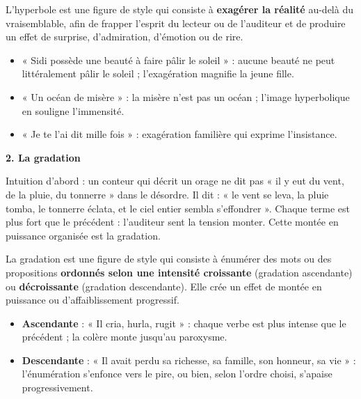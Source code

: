\documentclass[11pt]{article}
\newcommand{\cle}[1]{{\popxbold\color{popdark}#1}}
\begin{document}
\begin{definition}[L'hyperbole]
L'\cle{hyperbole} est une figure de style qui consiste à \textbf{exagérer la réalité} au-delà du vraisemblable, afin de frapper l'esprit du lecteur ou de l'auditeur et de produire un effet de surprise, d'admiration, d'émotion ou de rire.
\end{definition}

\begin{exemplebox}
\begin{itemize}
\item « Sidi possède une beauté à faire pâlir le soleil » : aucune beauté ne peut littéralement pâlir le soleil ; l'exagération magnifie la jeune fille.
\item « Un océan de misère » : la misère n'est pas un océan ; l'image hyperbolique en souligne l'immensité.
\item « Je te l'ai dit mille fois » : exagération familière qui exprime l'insistance.
\end{itemize}
\end{exemplebox}

\textbf{2. La gradation}

Intuition d'abord : un conteur qui décrit un orage ne dit pas « il y eut du vent, de la pluie, du tonnerre » dans le désordre. Il dit : « le vent se leva, la pluie tomba, le tonnerre éclata, et le ciel entier sembla s'effondrer ». Chaque terme est plus fort que le précédent : l'auditeur sent la tension monter. Cette montée en puissance organisée est la gradation.

\begin{definition}[La gradation]
La \cle{gradation} est une figure de style qui consiste à énumérer des mots ou des propositions \textbf{ordonnés selon une intensité croissante} (gradation ascendante) ou \textbf{décroissante} (gradation descendante). Elle crée un effet de montée en puissance ou d'affaiblissement progressif.
\end{definition}

\begin{exemplebox}
\begin{itemize}
\item \textbf{Ascendante} : « Il cria, hurla, rugit » : chaque verbe est plus intense que le précédent ; la colère monte jusqu'au paroxysme.
\item \textbf{Descendante} : « Il avait perdu sa richesse, sa famille, son honneur, sa vie » : l'énumération s'enfonce vers le pire, ou bien, selon l'ordre choisi, s'apaise progressivement.
\end{itemize}
\end{exemplebox}
\end{document}
